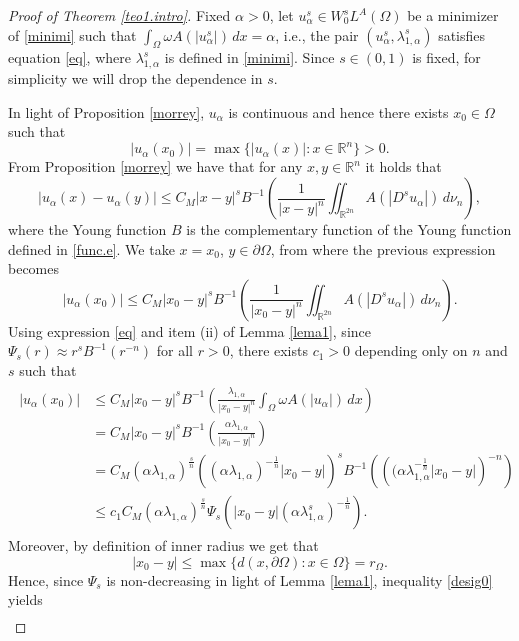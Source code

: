 \documentclass[12pt,reqno]{amsart}
\theoremstyle{definition}
\theoremstyle{remark}
\numberwithin{equation}{section}
\begin{document}
\begin{proof}[Proof of Theorem \ref{teo1.intro}]
Fixed $\alpha>0$, let $u_\alpha^s \in W^s_0 L^A(\Omega)$ be a minimizer of \eqref{minimi} such that $\int_\Omega \omega A(|u_\alpha^s|)\,dx =\alpha$, i.e., the pair $(u_\alpha^s, \lambda_{1,\alpha}^s)$ satisfies equation \eqref{eq}, where  $\lambda_{1,\alpha}^s$ is defined in \eqref{minimi}. Since $s\in(0,1)$ is fixed, for simplicity we will drop the dependence in $s$.

In light of Proposition \ref{morrey},  $u_\alpha$ is continuous and hence there exists $x_0\in \Omega$ such that
$$
|u_\alpha(x_0)|=\max\{|u_\alpha(x)|\colon x \in \mathbb{R}^n\}>0.
$$
From Proposition \ref{morrey} we have that for any $x,y\in \mathbb{R}^n$ it holds that
$$
|u_\alpha(x)-u_\alpha(y)|\leq C_M |x-y|^s B^{-1}\left(  \frac{1}{|x-y|^n} \iint_{\mathbb{R}^{2n}} A(|D^s u_\alpha|) \,d\nu_n\right),
$$
where the Young function $B$ is the complementary function of the Young function defined in \eqref{func.e}. We take $x=x_0$, $y\in \partial\Omega$, from where the previous expression becomes
$$
|u_\alpha(x_0)|\leq C_M |x_0-y|^s B^{-1}\left(  \frac{1}{|x_0-y|^n} \iint_{\mathbb{R}^{2n}} A(|D^s u_\alpha|) \,d\nu_n\right).
$$
Using expression \eqref{eq} and  item (ii) of Lemma \ref{lema1}, since $\Psi_s(r)\approx r^s B^{-1}(r^{-n})$ for all $r>0$, there exists $c_1>0$ depending only on $n$ and $s$ such that
\begin{align}\label{desig0}
\begin{split}
|u_\alpha(x_0)|&\leq C_M |x_0-y|^s B^{-1}\left(  \frac{\lambda_{1,\alpha} }{|x_0-y|^n}  \int_\Omega \omega A(|u_\alpha|)\,dx\right)\\
&= C_M |x_0-y|^s B^{-1}\left(   \frac{ \alpha \lambda_{1,\alpha}}{|x_0-y|^n}\right)\\
&=
C_M (\alpha\lambda_{1,\alpha})^\frac{s}{n} \left((\alpha \lambda_{1,\alpha})^{-\frac{1}{n}} |x_0-y| \right)^s B^{-1}\left(  \left( (\alpha \lambda_{1,\alpha}^{-\frac1n} |x_0-y| \right)^{-n} \right)\\
&\leq  
c_1  C_M \left(\alpha \lambda_{1,\alpha}  \right)^{\frac{s}{n}}\Psi_s \left( |x_0-y| \left( \alpha \lambda_{1,\alpha}^s   \right)^{-\frac{1}{n}}\right).
\end{split}
\end{align}
Moreover, by definition of  inner radius we get that
$$
|x_0-y| \leq \max\{d(x,\partial\Omega)\colon x\in \Omega\} = r_\Omega.
$$
Hence, since   $\Psi_s$ is non-decreasing in light of Lemma \ref{lema1}, inequality \eqref{desig0} yields
\begin{align} \label{eq.u0}

\end{align}
\end{proof}
\end{document}
